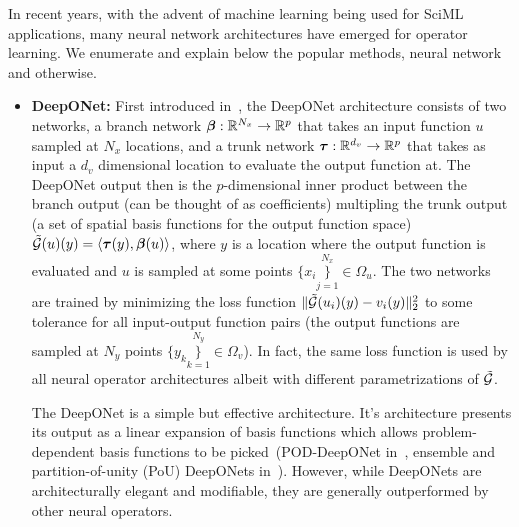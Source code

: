 In recent years, with the advent of machine learning being used for SciML applications, many neural network architectures have emerged for operator learning. We enumerate and explain below the popular methods, neural network and otherwise.
\begin{itemize}
\item {\bf DeepONet:} First introduced in~\citep{lu2019deeponet}, the DeepONet architecture consists of two networks, a branch network $\boldsymbol{\beta}: \mathbb{R}^{N_x} \rightarrow \mathbb{R}^p$ that takes an input function $u$ sampled at $N_x$ locations, and a trunk network $\boldsymbol{\tau}: \mathbb{R}^{d_v} \rightarrow \mathbb{R}^p$ that takes as input a $d_v$ dimensional location to evaluate the output function at. The DeepONet output then is the $p$-dimensional inner product between the branch output (can be thought of as coefficients) multipling the trunk output (a set of spatial basis functions for the output function space) $\tilde{\mathcal{G}}(u)(y) = \langle \boldsymbol{\tau}(y), \boldsymbol{\beta}(u) \rangle$, where $y$ is a location where the output function is evaluated and $u$ is sampled at some points $\{x_i\}\limits_{j=1}^{N_x} \in \Omega_u$. The two networks are trained by minimizing the loss function $\|\tilde{\mathcal{G}}(u_i)(y) - v_i(y) \|_2^2$ to some tolerance for all input-output function pairs (the output functions are sampled at $N_y$ points $\{y_k\}\limits_{k=1}^{N_y} \in \Omega_v$). In fact, the same loss function is used by all neural operator architectures albeit with different parametrizations of $\tilde{\mathcal{G}}$.

The DeepONet is a simple but effective architecture. It's architecture presents its output as a linear expansion of basis functions which allows problem-dependent basis functions to be picked~(POD-DeepONet in~\citep{lu2022comprehensive}, ensemble and partition-of-unity (PoU) DeepONets in~\citep{sharma2024ensemble}). However, while DeepONets are architecturally elegant and modifiable, they are generally outperformed by other neural operators.


\end{itemize}
